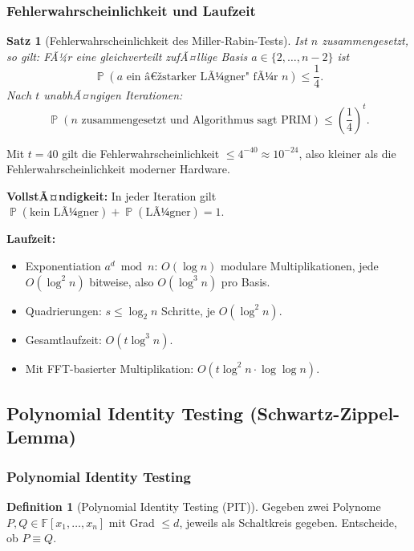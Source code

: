 ﻿\documentclass[12pt,a4paper]{article}
\theoremstyle{definition}
\newtheorem{definition}{Definition}[section]
\theoremstyle{plain}
\newtheorem{satz}{Satz}[section]
\theoremstyle{remark}
\DeclareMathOperator{\Prob}{\mathbb{P}}
\begin{document}
\subsubsection{Fehlerwahrscheinlichkeit und Laufzeit}

\begin{satz}[Fehlerwahrscheinlichkeit des Miller-Rabin-Tests]\label{satz:mrfehler}
  Ist $n$ zusammengesetzt, so gilt: FÃ¼r eine gleichverteilt zufÃ¤llige
  Basis $a \in \{2, \ldots, n-2\}$ ist
  \[
    \Prob\!\left(\text{$a$ ein â€žstarker LÃ¼gner" fÃ¼r $n$}\right)
    \leq \frac{1}{4}.
  \]
  Nach $t$ unabhÃ¤ngigen Iterationen:
  \[
    \Prob\!\left(\text{$n$ zusammengesetzt und Algorithmus sagt PRIM}\right)
    \leq \left(\frac{1}{4}\right)^{\!t}.
  \]
\end{satz}

Mit $t = 40$ gilt die Fehlerwahrscheinlichkeit $\leq 4^{-40} \approx 10^{-24}$,
also kleiner als die Fehlerwahrscheinlichkeit moderner Hardware.

\textbf{VollstÃ¤ndigkeit:} In jeder Iteration gilt
$\Prob(\text{kein LÃ¼gner}) + \Prob(\text{LÃ¼gner}) = 1$.

\textbf{Laufzeit:}
\begin{itemize}
  \item Exponentiation $a^d \bmod n$: $O(\log n)$ modulare Multiplikationen,
    jede $O(\log^2 n)$ bitweise, also $O(\log^3 n)$ pro Basis.
  \item Quadrierungen: $s \leq \log_2 n$ Schritte, je $O(\log^2 n)$.
  \item Gesamtlaufzeit: $O(t \log^3 n)$.
  \item Mit FFT-basierter Multiplikation: $O(t \log^2 n \cdot \log\log n)$.
\end{itemize}

\subsection{Polynomial Identity Testing (Schwartz-Zippel-Lemma)}
\label{subsec:schwartz}

\subsubsection{Polynomial Identity Testing}

\begin{definition}[Polynomial Identity Testing (PIT)]\label{def:pit}
  Gegeben zwei Polynome $P, Q \in \mathbb{F}[x_1, \ldots, x_n]$ mit Grad
  $\leq d$, jeweils als Schaltkreis gegeben. Entscheide, ob $P \equiv Q$.
\end{definition}
\end{document}
